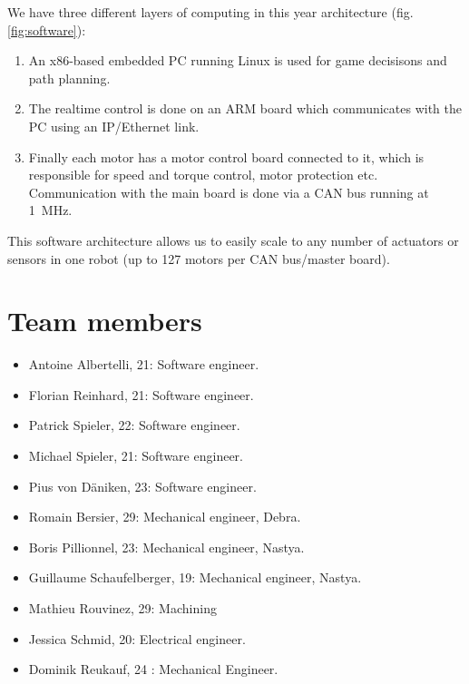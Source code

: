 \documentclass[a4paper]{paper}
\begin{document}
We have three different layers of computing in this year architecture (fig. \ref{fig:software}):
\begin{enumerate}
    \item An x86-based embedded PC running Linux is used for game decisisons and path planning.
    \item The realtime control is done on an ARM board which communicates with the PC using an IP/Ethernet link.
    \item Finally each motor has a motor control board connected to it, which is responsible for speed and torque control, motor protection etc.
        Communication with the main board is done via a CAN bus running at \SI{1}{\mega\hertz}.
\end{enumerate}


This software architecture allows us to easily scale to any number of actuators or sensors in one robot (up to 127 motors per CAN bus/master board).

\section{Team members}
\begin{itemize}
    \item Antoine Albertelli, 21: Software engineer.
    \item Florian Reinhard, 21:  Software engineer.
    \item Patrick Spieler, 22:  Software engineer.
    \item Michael Spieler, 21:  Software engineer.
    \item Pius von Däniken, 23:  Software engineer.
    \item Romain Bersier, 29:  Mechanical engineer, Debra.
    \item Boris Pillionnel, 23:  Mechanical engineer, Nastya.
    \item Guillaume Schaufelberger, 19: Mechanical engineer, Nastya.
    \item Mathieu Rouvinez, 29:  Machining
    \item Jessica Schmid, 20: Electrical engineer.
    \item Dominik Reukauf, 24 : Mechanical Engineer.
\end{itemize}

\clearpage


\end{document}
